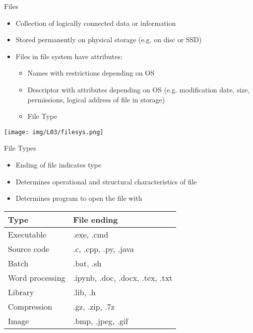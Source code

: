 \documentclass[hyperref={pdfpagelabels=false},aspectratio=169]{beamer}
\begin{document}
\begin{frame}{Files}

    \begin{minipage}{0.5\textwidth}
        \begin{itemize}
            \item Collection of logically connected data or information
            \item Stored permanently on physical storage (e.g. on disc or SSD)
            \item Files in file system have attributes:
            \begin{itemize}
                \item Names with restrictions depending on OS
                \item Descriptor with attributes depending on OS (e.g. modification date, size, permissions, logical address of file in storage)
                \item File Type 
            \end{itemize}
        \end{itemize}
    \end{minipage}
    \begin{minipage}{0.49\textwidth}
        \centering
        \texttt{[image: img/L03/filesys.png]}
    \end{minipage}
\end{frame}

\begin{frame}{File Types}
    \begin{itemize}
        \item Ending of file indicates type
        \item Determines operational and structural characteristics of file
        \item Determines program to open the file with
    \end{itemize}
    
    \vspace{10pt}
    \centering
    \begin{tabular}{l|l}
Type &	File ending \\ \hline 
Executable & .exe, .cmd \\
Source code	& .c, .cpp, .py, .java \\
Batch &	.bat, .sh \\
Word processing & .ipynb, .doc, .docx, .tex, .txt \\
Library & .lib, .h \\
Compression	& .gz, .zip, .7z\\
Image & .bmp, .jpeg, .gif
    \end{tabular}
    
\end{frame}
\end{document}
